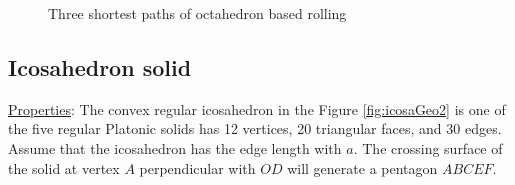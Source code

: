 \begin{figure}[h!]
\hfill
{}
\caption{Three shortest paths of octahedron based rolling}
\label{fig:octaPaths}
\end{figure}

\clearpage
\newpage
\subsection{Icosahedron solid}
\noindent\uline{Properties}:
The convex regular icosahedron in the Figure \ref{fig:icosaGeo2} is one of the five regular Platonic solids has 12 vertices, 20 triangular faces, and 30 edges. 
Assume that the icosahedron has the edge length with $a$. 
The crossing surface of the solid at vertex $A$ perpendicular with $OD$ will generate a pentagon $ABCEF$.

